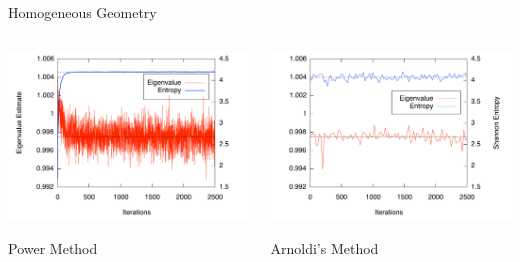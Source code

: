 \documentclass[xcolor={usenames, dvipsnames},]{beamer}
\begin{document}
\begin{frame}{Homogeneous Geometry}
\begin{columns}[t,onlytextwidth]
    \begin{column}{0.5\textwidth}
        \includegraphics[width=1.1\textwidth,keepaspectratio]{Figures/50mfpPower}
        \begin{center} \hspace{6ex}Power Method \end{center}
    \end{column}
    \begin{column}{0.5\textwidth}
        \includegraphics[width=1.1\textwidth,keepaspectratio]{Figures/50mfpArnoldi}
        \begin{center} \hspace{2ex}Arnoldi's Method \end{center}
    \end{column}
\end{columns}
\end{frame}
\end{document}
